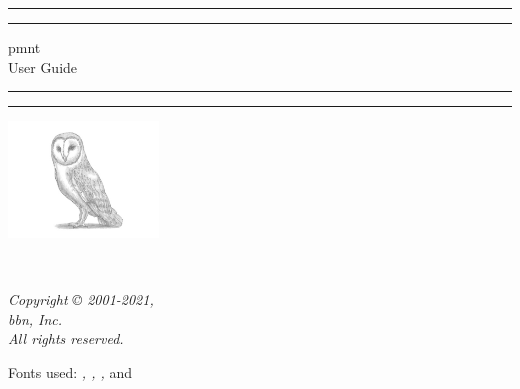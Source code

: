 
\begin{titlepage}
	\centering

	\vspace*{\baselineskip}

	\rule{\textwidth}{1.6pt}\vspace*{-\baselineskip}\vspace*{2pt}
	\rule{\textwidth}{0.4pt}

	\vspace{0.75\baselineskip}

	{\LARGE\acl{pmnt}\\User Guide\\}

	\vspace{0.75\baselineskip}

	\rule{\textwidth}{0.4pt}\vspace*{-\baselineskip}\vspace{3.2pt}
	\rule{\textwidth}{1.6pt}

	\vspace{2\baselineskip}

	\includegraphics[width=0.3\textwidth]{includes/BarnOwl.jpeg}

	\vspace*{4\baselineskip}

	{\Large\theauthor\\}

	\vspace{0.5\baselineskip}

	\textit{\thedate}

	\vfill

	\textit{Copyright © 2001-2021,\\
	\acl{bbn}, Inc.\\
	All rights reserved.}

	{\small Fonts used:  \emph{\mainfont, \sansfont, \monofont,} and \emph{\mathfont}}
\end{titlepage}
\tableofcontents
\listoffigures
\listoftables
